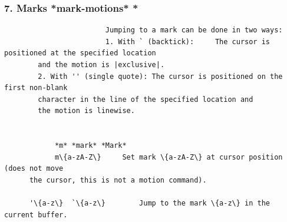 \documentclass{beamer}
\begin{document}
\begin{frame}[fragile]
  \frametitle{7. Marks					*mark-motions* *}

                        \begin{verbatim}
                        Jumping to a mark can be done in two ways:
                        1. With ` (backtick):	  The cursor is positioned at the specified location
        and the motion is |exclusive|.
        2. With '' (single quote): The cursor is positioned on the first non-blank
        character in the line of the specified location and
        the motion is linewise.


            *m* *mark* *Mark*
            m\{a-zA-Z\}		Set mark \{a-zA-Z\} at cursor position (does not move
      the cursor, this is not a motion command).

      '\{a-z\}  `\{a-z\}		Jump to the mark \{a-z\} in the current buffer.



\end{verbatim}
\end{frame}
\end{document}
